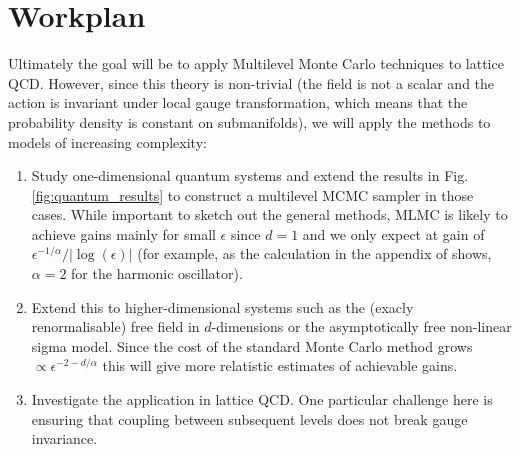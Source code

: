 \documentclass[11pt]{article}
\begin{document}
\section{Workplan}
Ultimately the goal will be to apply Multilevel Monte Carlo techniques to lattice QCD. However, since this theory is non-trivial (the field is not a scalar and the action is invariant under local gauge transformation, which means that the probability density is constant on submanifolds), we will apply the methods to models of increasing complexity:
\begin{enumerate}
\item Study one-dimensional quantum systems and extend the results in Fig. \ref{fig:quantum_results} to construct a multilevel MCMC sampler in those cases. While important to sketch out the general methods, MLMC is likely to achieve gains mainly for small $\epsilon$ since $d=1$ and we only expect at gain of $\epsilon^{-1/\alpha}/|\log(\epsilon)|$ (for example, as the calculation in the appendix of \cite{Creutz1981} shows, $\alpha=2$ for the harmonic oscillator).
\item Extend this to higher-dimensional systems such as the (exacly renormalisable) free field in $d$-dimensions or the asymptotically free non-linear sigma model. Since the cost of the standard Monte Carlo method grows $\propto \epsilon^{-2-d/\alpha}$ this will give more relatistic estimates of achievable gains.
\item Investigate the application in lattice QCD. One particular challenge here is ensuring that coupling between subsequent levels does not break gauge invariance.
\end{enumerate}

{\footnotesize
  
}
\end{document}
